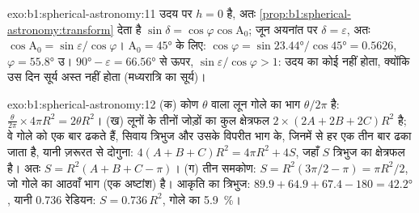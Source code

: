 \begin{solution}{exo:b1:spherical-astronomy:11}
उदय पर $h = 0$ है, अतः \cref{prop:b1:spherical-astronomy:transform} देता है
$\sin\delta = \cos\varphi\cos\mathrm{A}_0$; जून अयनांत पर $\delta = \varepsilon$, अतः
$\cos\mathrm{A}_0 = \sin\varepsilon/\cos\varphi$। $\mathrm{A}_0 = \ang{45}$ के लिए:
$\cos\varphi = \sin\ang{23.44}/\cos\ang{45} =
0.5626$, $\varphi = \ang{55.8}$ उ। $\ang{90} - \varepsilon =
\ang{66.56}$ से ऊपर, $\sin\varepsilon/\cos\varphi > 1$: उदय का कोई  नहीं होता, क्योंकि उस
दिन सूर्य अस्त नहीं होता (मध्यरात्रि का सूर्य)।
\end{solution}

\begin{solution}{exo:b1:spherical-astronomy:12}
(क) कोण $\theta$ वाला लून गोले का भाग $\theta/2\pi$ है:
$\frac{\theta}{2\pi}\times4\pi R^2 = 2\theta R^2$। (ख) लूनों के तीनों जोड़ों का कुल क्षेत्रफल
$2\times(2A + 2B + 2C)R^2$ है; वे गोले को एक बार ढकते हैं, सिवाय त्रिभुज और उसके विपरीत भाग के,
जिनमें से हर एक तीन बार ढका जाता है, यानी ज़रूरत से दोगुना:
$4(A + B + C)R^2 = 4\pi R^2 + 4S$, जहाँ $S$ त्रिभुज का क्षेत्रफल है। अतः
$S = R^2(A + B + C - \pi)$। (ग) तीन समकोण: $S = R^2(3\pi/2 - \pi) = \pi R^2/2$, जो गोले का
आठवाँ भाग (एक अष्टांश) है। आकृति का त्रिभुज: $89.9 + 64.9 + 67.4 - 180 = \ang{42.2}$, यानी
\num{0.736} रेडियन: $S = 0.736\,R^2$, गोले का \qty{5.9}{\percent}।
\end{solution}

